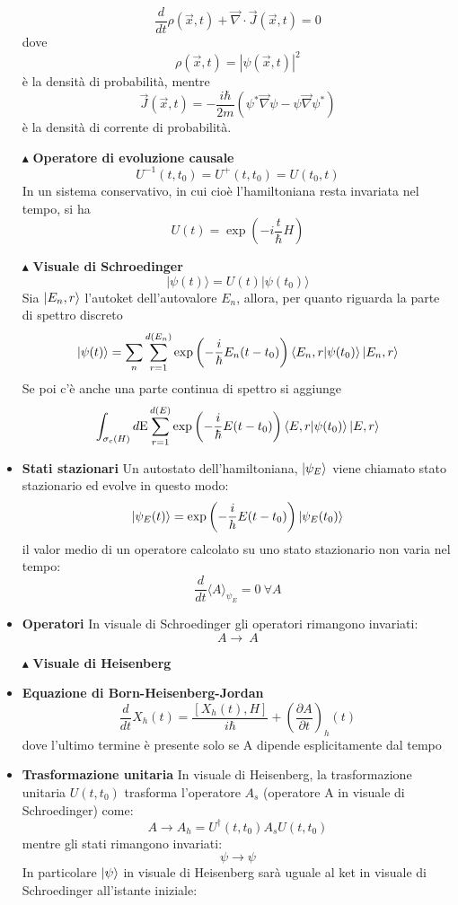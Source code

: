 \documentclass{book}
\newcommand{\g}{\textbf}
\newcommand{\e}{\begin{equation}}
\newcommand{\ex}{\end{equation} }
\renewcommand{\it}{\item[$\cdot$]}
\begin{document}
\begin{multicols}{4}
\begin{itemize}
\e{\frac{d}{dt}{\rho(\vec{x},t)} + \vec{\nabla} \cdot \vec{J}(\vec{x},t) = 0}\ex
dove 
\e{\rho(\vec{x},t) = |\psi(\vec{x},t)|^{2}}\ex è la densità di probabilità, mentre
\e{\vec{J}(\vec{x},t) = -\frac{i\hbar}{2m}\left(\psi^{*}\vec{\nabla} \psi  - \psi \vec{\nabla} \psi^{*}\right) }\ex
è la densità di corrente di probabilità.
\item [$\blacktriangle$] \g{Operatore di evoluzione causale}
\e{U^{-1}(t,t_{0}) = U^{+}(t,t_{0}) = U(t_{0},t)}\ex
In un sistema conservativo, in cui cioè l'hamiltoniana resta invariata nel tempo, si ha 
        \e{U(t) = \exp\left(-i\frac{t}{\hbar}H\right)} \ex

    \item [$\blacktriangle$] \g{Visuale di Schroedinger}
        \e{|\psi(t)\rangle = U(t) |\psi(t_{0})\rangle} \ex
        Sia $\ket{E_{n}, r}$ l’autoket dell’autovalore $E_n$, allora, per quanto riguarda la parte di spettro discreto
        \e{|\psi(t)\rangle = \sum_n \sum_{r=1}^{d(E_{n})}\exp\left(-\frac{i}{\hbar} E_n(t - t_0)\right) \braket{E_{n}, r}{\psi(t_{0})} \ket{E_{n},r}} \ex
        Se poi c'è anche una parte continua di spettro si aggiunge
        \e{\int_{\sigma_{c}(H)}d\text{E}\sum_{r=1}^{d(E)}\exp\left(-\frac{i}{\hbar} E(t - t_0)\right) \braket{E, r}{\psi(t_{0})} \ket{E,r}}\ex
        \it \g{Stati stazionari}
Un autostato dell'hamiltoniana, $\ket{\psi_{E}}$ viene chiamato stato stazionario ed evolve in questo modo:
\e{\ket{\psi_{E}(t)} = \text{exp}\left(-\frac{i}{h}E(t-t_{0})\right)\ket{\psi_{E}(t_{0})}}\ex
il valor medio di un operatore calcolato su uno stato stazionario non varia nel tempo:
\e{\frac{d}{dt}\langle A \rangle_{\psi_{E}} = 0 \ \forall A} \label{valor medio stato stazionario}\ex
\it \g{Operatori}       
In visuale di Schroedinger gli operatori rimangono invariati:
\e{A \rightarrow \ A}\ex
\item [$\blacktriangle$] \g{Visuale di Heisenberg}
    \it \g{Equazione di Born-Heisenberg-Jordan}
        \e{\frac{d}{dt} X_h(t) = \frac{[X_h(t), H]}{i\hbar} + \left(\frac{\partial A}{\partial t}\right)_{h}(t)} \ex
        dove l'ultimo termine è presente solo se A dipende esplicitamente dal tempo
    \it \g{Trasformazione unitaria}
        In visuale di Heisenberg, la trasformazione unitaria $U(t, t_{0})$ trasforma l’operatore $A_{s}$ (operatore A in visuale di Schroedinger) come:
        \e{A \to A_{h} = U^\dagger(t, t_{0}) A_{s} U(t, t_{0})} \ex
        mentre gli stati rimangono invariati:
        \e{\psi \to \psi} \ex
        In particolare $\ket{\psi}$ in visuale di Heisenberg sarà uguale al ket in visuale di Schroedinger all'istante iniziale:

\end{itemize}
\end{multicols}
\end{document}
